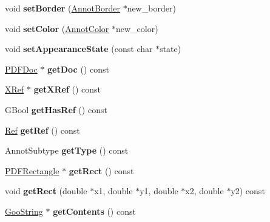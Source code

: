 \begin{DoxyCompactItemize}
void {\bfseries set\+Border} (\hyperlink{class_annot_border}{Annot\+Border} $\ast$new\+\_\+border)
\item 
\mbox{\label{class_annot_ab9d4cd7f412b990c9ef2aeaaef2db809}} 
void {\bfseries set\+Color} (\hyperlink{class_annot_color}{Annot\+Color} $\ast$new\+\_\+color)
\item 
\mbox{\label{class_annot_a21f78190259d25e12a0c24da1c8c80e0}} 
void {\bfseries set\+Appearance\+State} (const char $\ast$state)
\item 
\mbox{\label{class_annot_a0ba806302625550b2609b9213fca4e4a}} 
\hyperlink{class_p_d_f_doc}{P\+D\+F\+Doc} $\ast$ {\bfseries get\+Doc} () const
\item 
\mbox{\label{class_annot_a8e055c40f943c3cbdca7a6b20b4664ec}} 
\hyperlink{class_x_ref}{X\+Ref} $\ast$ {\bfseries get\+X\+Ref} () const
\item 
\mbox{\label{class_annot_a6825d1ee36e1d7a5b94371e3509043d4}} 
G\+Bool {\bfseries get\+Has\+Ref} () const
\item 
\mbox{\label{class_annot_ad641e42aaf69eadee84e2f059be98d59}} 
\hyperlink{struct_ref}{Ref} {\bfseries get\+Ref} () const
\item 
\mbox{\label{class_annot_aaa16434da387aeaa2a363854373efbc0}} 
Annot\+Subtype {\bfseries get\+Type} () const
\item 
\mbox{\label{class_annot_a0a631fd01ba1652adbce5b7defcc924a}} 
\hyperlink{class_p_d_f_rectangle}{P\+D\+F\+Rectangle} $\ast$ {\bfseries get\+Rect} () const
\item 
\mbox{\label{class_annot_a3fe65d7c145258f605edf8fd0852e399}} 
void {\bfseries get\+Rect} (double $\ast$x1, double $\ast$y1, double $\ast$x2, double $\ast$y2) const
\item 
\mbox{\label{class_annot_ab3ef8b0902f480334f579a95adc174dc}} 
\hyperlink{class_goo_string}{Goo\+String} $\ast$ {\bfseries get\+Contents} () const
\item 
\mbox{\label{class_annot_a44fdff34003579a25b368fe01633fbee}} 

\end{DoxyCompactItemize}
